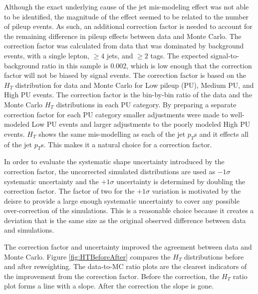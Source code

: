 \par Although the exact underlying cause of the jet mis-modeling
effect was not able to be identified, the magnitude of the effect
seemed to be related to the number of pileup events.  As such, an
additional correction factor is needed to account for the remaining
difference in pileup effects between data and Monte Carlo.  The 
correction factor was calculated from data that was dominated by
background events, with a single lepton, $\geq 4$ jets, and
$\geq 2$ tags. The expected signal-to-background ratio in this sample
is 0.002, which is low enough that the correction factor will not be
biased by signal events.  The correction factor is based on the $H_{T}$
distribution for data and Monte Carlo for Low pileup (PU), Medium PU,
and High PU events. The correction factor is the bin-by-bin ratio of
the data and the Monte Carlo $H_{T}$ distributions in each PU
category.  By preparing a separate correction factor for each PU
category smaller adjustments were made to well-modeled Low PU events and
larger adjustments to the poorly modeled High PU events.  $H_{T}$
shows the same mis-modelling as each of the jet $p_{T}$s and it
effects all of the jet $p_{T}$s. This makes it a natural choice for a
correction factor.

\par In order to evaluate the systematic shape uncertainty introduced
by the correction factor, the uncorrected simulated distributions are
used as $-1\sigma$ systematic uncertainty and the $+1\sigma$
uncertainty is determined by doubling the correction factor. The
factor of two for the $+1\sigma$ variation is motivated by the deisre
to provide a large enough systematic uncertainty to cover any possible
over-correction of the simulations.  This is a reasonable choice
because it creates a deviation that is the same size as the original
observed difference between data and simulations. 

\par The correction factor and uncertainty improved the agreement
between data and Monte Carlo. Figure \ref{fig:HTBeforeAfter}
compares the $H_{T}$ distributions before and after
reweighting. The data-to-MC ratio plots are the clearest indicators of
the improvement from the correction factor. Before the correction,
the $H_{T}$ ratio plot forms a line with a slope. After the correction
the slope is gone.


